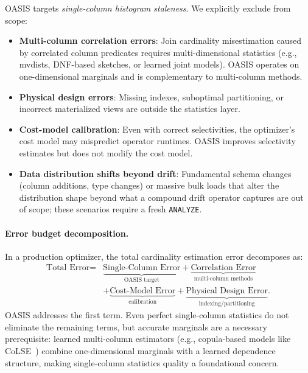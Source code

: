 \documentclass[11pt]{article}
\begin{document}
OASIS targets \emph{single-column histogram staleness}.
We explicitly exclude from scope:
\begin{itemize}
  \item \textbf{Multi-column correlation errors}: Join cardinality misestimation
        caused by correlated column predicates requires multi-dimensional
        statistics (e.g., mvdists, DNF-based sketches, or learned joint models).
        OASIS operates on one-dimensional marginals and is complementary to
        multi-column methods.
  \item \textbf{Physical design errors}: Missing indexes, suboptimal partitioning,
        or incorrect materialized views are outside the statistics layer.
  \item \textbf{Cost-model calibration}: Even with correct selectivities, the
        optimizer's cost model may mispredict operator runtimes.
        OASIS improves selectivity estimates but does not modify the cost model.
  \item \textbf{Data distribution shifts beyond drift}: Fundamental schema changes
        (column additions, type changes) or massive bulk loads that alter the
        distribution shape beyond what a compound drift operator captures are
        out of scope; these scenarios require a fresh \texttt{ANALYZE}.
\end{itemize}

\paragraph{Error budget decomposition.}
In a production optimizer, the total cardinality estimation error decomposes as:
\[
  \begin{split}
  \text{Total Error} ={}& \underbrace{\text{Single-Column Error}}_{\text{OASIS target}}
  + \underbrace{\text{Correlation Error}}_{\text{multi-column methods}} \\
  &+ \underbrace{\text{Cost-Model Error}}_{\text{calibration}}
  + \underbrace{\text{Physical Design Error}}_{\text{indexing/partitioning}}.
  \end{split}
\]
OASIS addresses the first term. Even perfect single-column statistics do not
eliminate the remaining terms, but accurate marginals are a necessary
prerequisite: learned multi-column estimators (e.g., copula-based models like
CoLSE~\cite{rathuwadu2025colse}) combine one-dimensional marginals with a
learned dependence structure, making single-column statistics quality a
foundational concern.
\end{document}
